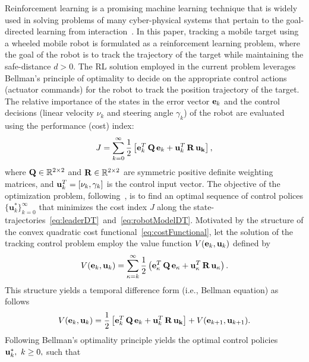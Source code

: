 \documentclass[conference]{IEEEtran}
\begin{document}
 Reinforcement learning is a promising  machine learning technique that is widely used in solving problems of many cyber-physical systems that pertain to the goal-directed learning from interaction~\cite{sutton2020reinforcement}. In this paper, tracking a mobile target using a wheeled mobile robot is formulated as a reinforcement learning problem, where the goal of the robot is to track the trajectory of the target while maintaining the safe-distance $d>0.$ The RL solution employed in the current problem leverages Bellman's principle of optimality to decide on the appropriate control actions (actuator commands) for the robot to track the position trajectory of the target. The relative importance of the states in the error vector ${\bf e}_k$ and the control decisions (linear velocity $\nu_k$ and steering angle $\gamma_k$) of the robot are evaluated using the  performance (cost) index: %
 \begin{align}
 \label{eq:costFunctional}
   J = \sum_{k=0}^\infty \frac{1}{2}\left[{\bf e}_k^T \, {\bf Q} \, {\bf e}_k + {\bf u}_k^T \, {\bf R} \, {\bf u_k}\right],
 \end{align}    
 where ${\bf Q}\in\mathbb{R}^{2\times 2}$ and ${\bf R}\in\mathbb{R}^{2\times 2}$ are symmetric positive definite weighting matrices, and ${\bf u}_k^T = [\nu_k,\gamma_k]$ is the control input vector.  The objective of the optimization problem, following~\cite{Lewis2013-Reinforcement}, is to find an optimal sequence of control polices $\{\mathbf{u}^*_k\}_{k=0}^\infty$ that minimizes the cost index $J$ along the state-trajectories~\eqref{eq:leaderDT}~and~\eqref{eq:robotModelDT}. Motivated by the structure of the convex quadratic cost functional~\eqref{eq:costFunctional}, let the solution of the tracking control problem employ the value function $V({\bf e}_k,{\bf u}_k)$ defined by %
 \begin{equation*}
 \label{eq:valueFunction}
 V({\bf e}_k,{\bf u}_k) = \sum_{\kappa=k}^\infty \frac{1}{2}\left({\bf e}_\kappa^T\, {\bf Q}\, {\bf e}_\kappa + {\bf u}_\kappa^T \, {\bf R}\, {\bf u_\kappa}\right).
 \end{equation*}
 This structure yields a temporal difference form (i.e., Bellman equation) as follows
 \begin{equation*}
 \label{eq:tempraldiffeq}
 V({\bf e}_k,{\bf u}_k)= \frac{1}{2}\left[{\bf e}_k^T\, {\bf Q}\, {\bf e}_k + {\bf u}_k^T\, {\bf R}\, {\bf u_k}\right] +V({\bf e}_{k+1},{\bf u}_{k+1}).
 \end{equation*}
 Following Bellman's optimality principle yields the optimal control policies ${\bf u}_k^*,~k\ge 0,$ such that~\cite{Lewis2012} %
\end{document}
